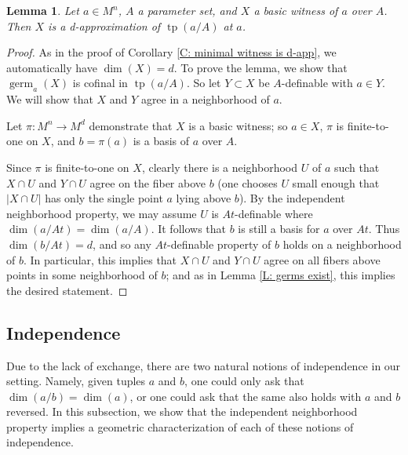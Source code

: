 \documentclass{amsart}
\newtheorem{lemma}[theorem]{Lemma}
\theoremstyle{definition}
\newcommand{\tp}{\operatorname{tp}}
\begin{document}
\begin{lemma}\label{L: basic witness}
    Let $a\in M^n$, $A$ a parameter set, and $X$ a basic witness of $a$ over $A$. Then $X$ is a d-approximation of $\tp(a/A)$ at $a$.
\end{lemma}
\begin{proof}
    As in the proof of Corollary \ref{C: minimal witness is d-app}, we automatically have $\dim(X)=d$. To prove the lemma, we show that $\operatorname{germ}_a(X)$ is cofinal in $\tp(a/A)$. So let $Y\subset X$ be $A$-definable with $a\in Y$. We will show that $X$ and $Y$ agree in a neighborhood of $a$.
    
    Let $\pi:M^n\rightarrow M^d$ demonstrate that $X$ is a basic witness; so $a\in X$, $\pi$ is finite-to-one on $X$, and $b=\pi(a)$ is a basis of $a$ over $A$.
    
    Since $\pi$ is finite-to-one on $X$, clearly there is a neighborhood $U$ of $a$ such that $X\cap U$ and $Y\cap U$ agree on the fiber above $b$ (one chooses $U$ small enough that $|X\cap U|$ has only the single point $a$ lying above $b$). By the independent neighborhood property, we may assume $U$ is $At$-definable where $\dim(a/At)=\dim(a/A)$. It follows that $b$ is still a basis for $a$ over $At$. Thus $\dim(b/At)=d$, and so any $At$-definable property of $b$ holds on a neighborhood of $b$. In particular, this implies that $X\cap U$ and $Y\cap U$ agree on all fibers above points in some neighborhood of $b$; and as in Lemma \ref{L: germs exist}, this implies the desired statement.
\end{proof}

\subsection{Independence}

Due to the lack of exchange, there are two natural notions of independence in our setting. Namely, given tuples $a$ and $b$, one could only ask that $\dim(a/b)=\dim(a)$, or one could ask that the same also holds with $a$ and $b$ reversed. In this subsection, we show that the independent neighborhood property implies a geometric characterization of each of these notions of independence.
\end{document}
